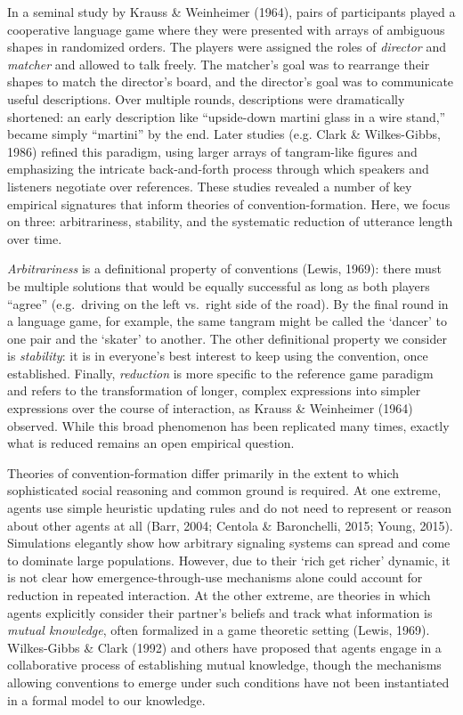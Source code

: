 \documentclass[10pt, letterpaper]{article}
\begin{document}
In a seminal study by Krauss \& Weinheimer (1964), pairs of participants
played a cooperative language game where they were presented with arrays
of ambiguous shapes in randomized orders. The players were assigned the
roles of \emph{director} and \emph{matcher} and allowed to talk freely.
The matcher's goal was to rearrange their shapes to match the director's
board, and the director's goal was to communicate useful descriptions.
Over multiple rounds, descriptions were dramatically shortened: an early
description like ``upside-down martini glass in a wire stand,'' became
simply ``martini'' by the end. Later studies (e.g. Clark \&
Wilkes-Gibbs, 1986) refined this paradigm, using larger arrays of
tangram-like figures and emphasizing the intricate back-and-forth
process through which speakers and listeners negotiate over references.
These studies revealed a number of key empirical signatures that inform
theories of convention-formation. Here, we focus on three:
arbitrariness, stability, and the systematic reduction of utterance
length over time.

\emph{Arbitrariness} is a definitional property of conventions (Lewis,
1969): there must be multiple solutions that would be equally successful
as long as both players ``agree'' (e.g.~driving on the left vs.~right
side of the road). By the final round in a language game, for example,
the same tangram might be called the `dancer' to one pair and the
`skater' to another. The other definitional property we consider is
\emph{stability}: it is in everyone's best interest to keep using the
convention, once established. Finally, \emph{reduction} is more specific
to the reference game paradigm and refers to the transformation of
longer, complex expressions into simpler expressions over the course of
interaction, as Krauss \& Weinheimer (1964) observed. While this broad
phenomenon has been replicated many times, exactly what is reduced
remains an open empirical question.

Theories of convention-formation differ primarily in the extent to which
sophisticated social reasoning and common ground is required. At one
extreme, agents use simple heuristic updating rules and do not need to
represent or reason about other agents at all (Barr, 2004; Centola \&
Baronchelli, 2015; Young, 2015). Simulations elegantly show how
arbitrary signaling systems can spread and come to dominate large
populations. However, due to their `rich get richer' dynamic, it is not
clear how emergence-through-use mechanisms alone could account for
reduction in repeated interaction. At the other extreme, are theories in
which agents explicitly consider their partner's beliefs and track what
information is \emph{mutual knowledge}, often formalized in a game
theoretic setting (Lewis, 1969). Wilkes-Gibbs \& Clark (1992) and others
have proposed that agents engage in a collaborative process of
establishing mutual knowledge, though the mechanisms allowing
conventions to emerge under such conditions have not been instantiated
in a formal model to our knowledge.
\end{document}
